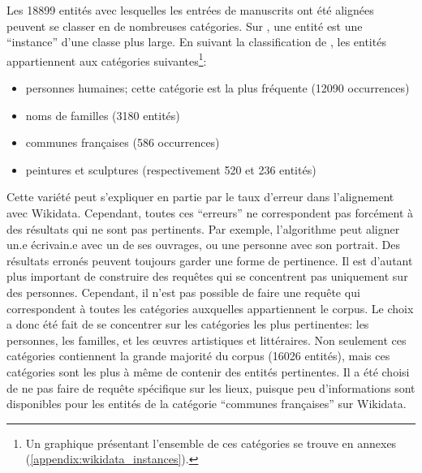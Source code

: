 Les 18899 entités avec lesquelles les entrées de manuscrits ont été alignées peuvent se classer en de nombreuses catégories. Sur \wkd{}, une entité est une \enquote{instance} d'une classe plus large. En suivant la classification de \wkd{}, les entités appartiennent aux catégories suivantes\footnote{Un graphique présentant l'ensemble de ces catégories se trouve en annexes (\ref{appendix:wikidata_instances}).}:
\begin{itemize}
	\item personnes humaines; cette catégorie est la plus fréquente (12090 occurrences)
	\item noms de familles (3180 entités)
	\item communes françaises (586 occurrences)
	\item peintures et sculptures (respectivement 520 et 236 entités)
\end{itemize}

Cette variété peut s'expliquer en partie par le taux d'erreur dans l'alignement avec Wikidata. Cependant, toutes ces \enquote{erreurs} ne correspondent pas forcément à des résultats qui ne sont pas pertinents. Par exemple, l'algorithme peut aligner un.e écrivain.e avec un de ses ouvrages, ou une personne avec son portrait. Des résultats erronés peuvent toujours garder une forme de pertinence. Il est d'autant plus important de construire des requêtes \sparql{} qui se concentrent pas uniquement sur des personnes. Cependant, il n'est pas possible de faire une requête qui correspondent à toutes les catégories auxquelles appartiennent le corpus. Le choix a donc été fait de se concentrer sur les catégories les plus pertinentes: les personnes, les familles, et les œuvres artistiques et littéraires. Non seulement ces catégories contiennent la grande majorité du corpus (16026 entités), mais ces catégories sont les plus à même de contenir des entités pertinentes. Il a été choisi de ne pas faire de requête spécifique sur les lieux, puisque peu d'informations sont disponibles pour les entités de la catégorie \enquote{communes françaises} sur Wikidata.

